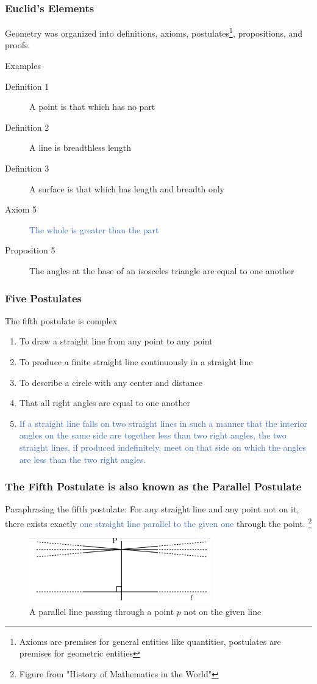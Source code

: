 \documentclass[unicode, 14pt, aspectratio=169]{beamer}
\newcommand\blfootnote[1]{%
  \begingroup
  \renewcommand\thefootnote{}\footnote{#1}%
  \addtocounter{footnote}{-1}%
  \endgroup
}
\begin{document}
\begin{frame}
  \frametitle{Euclid's Elements}
  {\large Geometry was organized into definitions, axioms, postulates\footnote{Axioms are premises for general entities like quantities, postulates are premises for geometric entities}, propositions, and proofs.}
  \par
  \vspace{16pt}
  Examples
  \begin{description}
  \item[Definition 1] A point is that which has no part
  \item[Definition 2] A line is breadthless length
  \item[Definition 3] A surface is that which has length and breadth only
  \item[Axiom 5] \textcolor{highlight}{The whole is greater than the part}
  \item[Proposition 5] The angles at the base of an isosceles triangle are equal to one another
  \end{description}
\end{frame}
\begin{frame}
  \frametitle{Five Postulates}
  {\large The fifth postulate is complex}
  \par
  \vspace{16pt}  
  \begin{enumerate}
  \item To draw a straight line from any point to any point
  \item To produce a finite straight line continuously in a straight line
  \item To describe a circle with any center and distance
  \item That all right angles are equal to one another
  \item \textcolor{highlight}{If a straight line falls on two straight lines in such a manner that the interior angles on the same side are together less than two right angles, the two straight lines, if produced indefinitely, meet on that side on which the angles are less than the two right angles.}
  \end{enumerate}
\end{frame}
\begin{frame}[t]
  \frametitle{The Fifth Postulate is also known as the Parallel Postulate}
  {\large Paraphrasing the fifth postulate: For any straight line and any point not on it, there exists exactly \textcolor{highlight}{one straight line parallel to the given one} through the point.}
  \blfootnote{Figure from "History of Mathematics in the World"\supercite{suugaku-no-sekaishi}}
  \begin{figure}
    \includegraphics[width=0.7\textwidth]{images/axiom5.png}
    \caption{A parallel line passing through a point $p$ not on the given line}
  \end{figure}
\end{frame}
\end{document}
